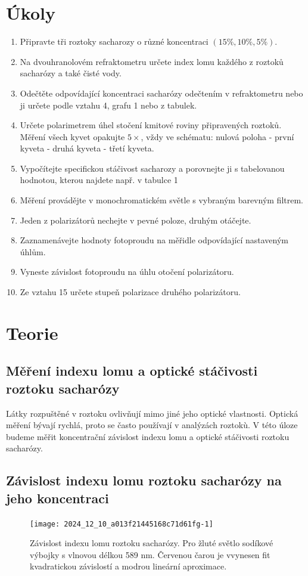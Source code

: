 \documentclass[czech,11pt,a4paper]{article}
\begin{document}
	\begin{multicols}{2}
		\section{Úkoly}
		\begin{enumerate}	
			\item Připravte tři roztoky sacharozy o různé koncentraci $(15 \%, 10 \%, 5 \%)$.
			\item Na dvouhranolovém refraktometru určete index lomu každého z roztoků sacharózy a také čisté vody.
			\item Odečtěte odpovídající koncentraci sacharózy odečtením v refraktometru nebo ji určete podle vztahu 4, grafu 1 nebo z tabulek.
			\item Určete polarimetrem úhel stočení kmitové roviny připravených roztoků. Měření všech kyvet opakujte $5 \times$, vždy ve schématu: nulová poloha - první kyveta - druhá kyveta - třetí kyveta.
			\item Vypočítejte specifickou stáčivost sacharozy a porovnejte ji s tabelovanou hodnotou, kterou najdete např. v tabulce 1
			\item Měření provádějte v monochromatickém světle s vybraným barevným filtrem.
			\item Jeden z polarizátorů nechejte v pevné poloze, druhým otáčejte.
			\item Zaznamenávejte hodnoty fotoproudu na měřidle odpovídající nastaveným úhlům.
			\item Vyneste závislost fotoproudu na úhlu otočení polarizátoru.
			\item Ze vztahu 15 určete stupeň polarizace druhého polarizátoru.
		
		\end{enumerate}
	\section{Teorie}
	\subsection*{Měření indexu lomu a optické stáčivosti roztoku sacharózy}
	Látky rozpuštěné v roztoku ovlivňují mimo jiné jeho optické vlastnosti. Optická měření bývají rychlá, proto se často používají v analýzách roztokù. V této úloze budeme měřit koncentrační závislost indexu lomu a optické stáčivosti roztoku sacharózy.
	
	\subsection*{Závislost indexu lomu roztoku sacharózy na jeho koncentraci}
	\begin{figure}[H]
		\texttt{[image: 2024\_12\_10\_a013f21445168c71d61fg-1]}
		\caption{Závislost indexu lomu roztoku sacharózy. Pro žluté světlo sodíkové výbojky s vlnovou délkou 589 nm. Červenou čarou je vvynesen fit kvadratickou závislostí a modrou lineární aproximace.}
	\end{figure}
	

\end{multicols}
\end{document}
